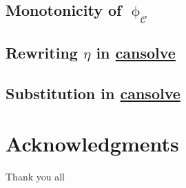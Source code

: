 \documentclass[12pt,a4paper,twoside]{book}
\begin{document}
\begin{appendices}
\section{Monotonicity of $\upphi_\mathscr{C}$}
\label{appdix:rec:monotono}
\section{Rewriting $\eta$ in \underline{cansolve}}
\label{appdix:rec:cansolve_pc}
\section{Substitution in \underline{cansolve}}
\label{appdix:rec:cansolve_sub}

\end{appendices}





\chapter*{Acknowledgments}
Thank you all
\end{document}
